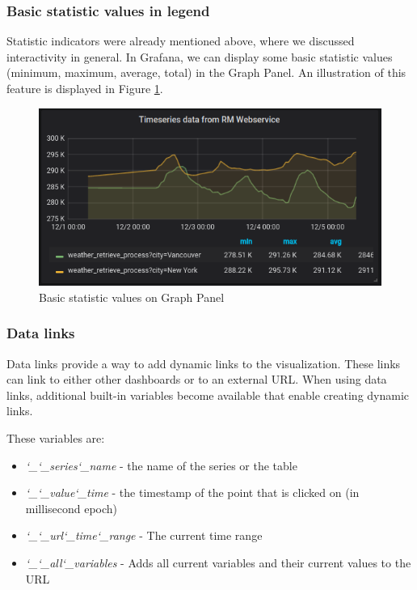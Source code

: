 \subsubsection{Basic statistic values in legend}

Statistic indicators were already mentioned above, where we discussed interactivity in general. In Grafana, we can display some basic statistic values (minimum, maximum, average, total) in the Graph Panel. An illustration of this feature is displayed in Figure \ref{fig:basic-statistics}.

\begin{figure}[H]
	\centering
	\includegraphics[width=130mm, keepaspectratio]{figures/basic-statistics.png}
	\caption{Basic statistic values on Graph Panel}
	\label{fig:basic-statistics}
\end{figure}

\subsubsection{Data links}

Data links provide a way to add dynamic links to the visualization. These links can link to either other dashboards or to an external URL. When using data links, additional built-in variables become available that enable creating dynamic links.\cite{grafana-graph-datalink}

These variables are:
\begin{itemize}
	\item \emph{\char`_\char`_series\char`_name} - the name of the series or the table
	\item \emph{\char`_\char`_value\char`_time} - the timestamp of the point that is clicked on (in millisecond epoch)
	\item \emph{\char`_\char`_url\char`_time\char`_range} - The current time range
	\item \emph{\char`_\char`_all\char`_variables} - Adds all current variables and their current values to the URL
\end{itemize}

